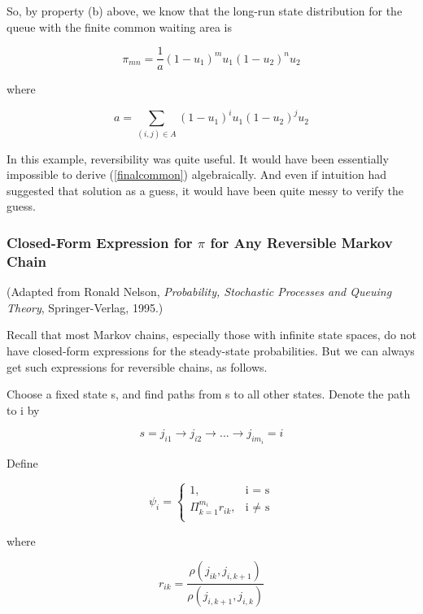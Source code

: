So, by property (b) above, we know that the long-run state distribution
for the queue with the finite common waiting area is

\begin{equation}
\label{finalcommon}
\pi_{mn} = \frac{1}{a} (1-u_1)^m u_1 (1-u_2)^n u_2
\end{equation}

where

\begin{equation}
a = \sum_{(i,j) \in A} (1-u_1)^i u_1 (1-u_2)^j u_2
\end{equation}

In this example, reversibility was quite useful.  It would have been
essentially impossible to derive (\ref{finalcommon}) algebraically.
And even if intuition had suggested that solution as a guess, it would
have been quite messy to verify the guess.  

\subsubsection{Closed-Form Expression for $\pi$ for Any Reversible Markov Chain}

(Adapted from Ronald Nelson, {\it Probability, Stochastic Processes and
Queuing Theory}, Springer-Verlag, 1995.)

Recall that most Markov chains, especially those with infinite state spaces,
do not have closed-form expressions for the steady-state probabilities.
But we can always get such expressions for reversible chains, as
follows.

Choose a fixed state s, and find paths from s to all other states.
Denote the path to i by

\begin{equation}
s = j_{i1} \rightarrow j_{i2} \rightarrow ... \rightarrow j_{im_i} = i
\end{equation} 

Define

\begin{equation}
\psi_i = \begin{cases}
   1, & \text{i = s} \\
   \Pi_{k=1}^{m_i} r_{ik}, & \text{i $\neq$ s} \\
\end{cases} 
\end{equation}

where

\begin{equation}
r_{ik} = \frac
{\rho(j_{ik},j_{i,k+1})}
{\rho(j_{i,k+1},j_{i,k})}
\end{equation}

